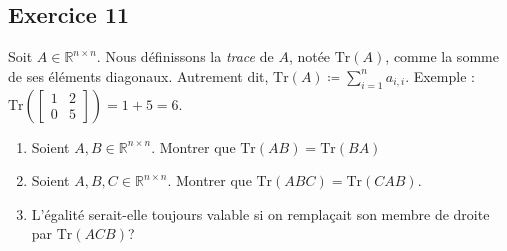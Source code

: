 \documentclass{article}
\newcommand{\R}{\mathbb{R}}
\newcommand{\cross}{\times}
\newcommand{\Tr}{\text{Tr}}
\begin{document}
\subsection*{Exercice 11}
\noindent Soit $A \in \R^{n \cross n}$. Nous définissons la \textit{trace} de $A$, notée $\Tr(A)$, comme la somme de ses éléments diagonaux. Autrement dit, $\displaystyle \Tr(A) \coloneqq \sum_{i=1}^{n} a_{i,i}$. Exemple : $\Tr\left(\begin{bmatrix}
1 & 2\\
0 & 5
\end{bmatrix}\right) = 1 + 5 = 6$.
\begin{enumerate}
    \item Soient $A,B \in \R^{n \cross n}$. Montrer que $\Tr(AB)=\Tr(BA)$
    \item Soient $A,B,C \in \R^{n \cross n}$. Montrer que $\Tr(ABC)=\Tr(CAB)$.
    \item L'égalité serait-elle toujours valable si on remplaçait son membre de droite par $\Tr(ACB)$?
\end{enumerate}
\end{document}
